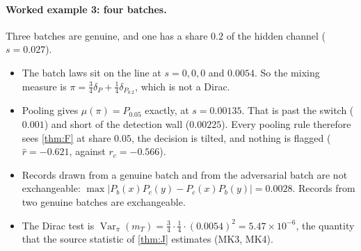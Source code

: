 \documentclass[11pt]{article}
\theoremstyle{definition}\newtheorem{definition}{Definition}\newtheorem{remark}{Remark}
\begin{document}
\paragraph{Worked example 3: four batches.} Three batches are genuine, and one has a share $0.2$ of the hidden channel ($s=0.027$).
\begin{itemize}
\item The batch laws sit on the line at $s=0,0,0$ and $0.0054$. So the mixing measure is $\pi=\tfrac34\delta_P+\tfrac14\delta_{P_{0.2}}$,
  which is not a Dirac.
\item Pooling gives $\mu(\pi)=P_{0.05}$ exactly, at $s=0.00135$. That is past the switch ($0.001$) and short of the detection wall
  ($0.00225$). Every pooling rule therefore sees \cref{thm:F} at share $0.05$, the decision is tilted, and nothing is flagged
  ($\hat r=-0.621$, against $r_c=-0.566$).
\item Records drawn from a genuine batch and from the adversarial batch are not exchangeable:
  $\max|P_b(x)P_c(y)-P_c(x)P_b(y)|=0.0028$. Records from two genuine batches are exchangeable.
\item The Dirac test is $\operatorname{Var}_\pi(m_T)=\tfrac34\cdot\tfrac14\cdot(0.0054)^2=5.47\times10^{-6}$, the quantity that the source
  statistic of \cref{thm:J} estimates (MK3, MK4).
\end{itemize}
\end{document}
